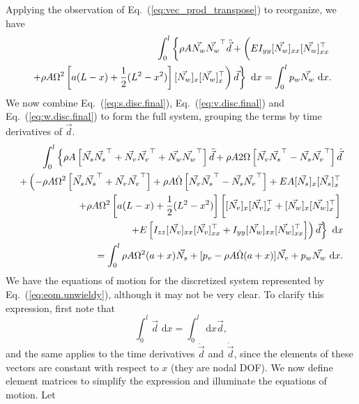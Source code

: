 Applying the observation of Eq.~(\ref{eq:vec_prod_transpose}) to reorganize, we have
\begin{eqnarray}
\label{eq:w.disc.final}
\int_0^l\left\lbrace\rho A\vec{N_w}\vec{N_w}^\top\ddot{\vec{d}}+\left(EI_{yy}[\vec{N_w}]_{xx}[\vec{N_w}]_{xx}^\top\vphantom{\frac{0}{0}}\right.\right.  \\
\left.\left.+\rho A\Omega^2\left[a(L-x)+\frac{1}{2}(L^2-x^2)\right][\vec{N_w}]_{x}[\vec{N_w}]_{x}^\top\right)\vec{d}\right\rbrace\text{ d}x 
= \int_0^lp_w\vec{N_w}\text{ d}x. \nonumber 
\end{eqnarray}
We now combine Eq.~(\ref{eq:s.disc.final}), Eq.~(\ref{eq:v.disc.final}) and Eq.~(\ref{eq:w.disc.final}) to form the full system, grouping the terms by time derivatives of $\vec{d}$.
\begin{eqnarray}
\label{eq:eom.unwieldy}
\int_0^l \left\lbrace\rho A\left[\vec{N_s}\vec{N_s}^\top+\vec{N_v}\vec{N_v}^\top+\vec{N_w}\vec{N_w}^\top\right]\ddot{\vec d}+\rho A2\Omega\left[\vec{N_v}\vec{N_s}^\top-\vec{N_s}\vec{N_v}^\top\right]\dot{\vec{d}}\right. \nonumber \\
\left.+\left(-\rho A\Omega^2\left[\vec{N_s}\vec{N_s}^\top+\vec{N_v}\vec{N_v}^\top\right]+\rho A\dot\Omega \left[\vec{N_v}\vec{N_s}^\top-\vec{N_s}\vec{N_v}^\top\right] +EA[\vec{N_s}]_x[\vec{N_s}]_x^\top\right.\right.\nonumber \\
\left.\left.+\rho A\Omega^2\left[a(L-x)+\frac{1}{2}(L^2-x^2)\right]\left[\vphantom{\frac{0}{0}}[\vec{N_v}]_{x}[\vec{N_v}]_{x}^\top+[\vec{N_w}]_{x}[\vec{N_w}]_{x}^\top\right]\right.\right.\\
\left.\left. +E\left[I_{zz}[\vec{N_v}]_{xx}[\vec{N_v}]_{xx}^\top+I_{yy}[\vec{N_w}]_{xx}[\vec{N_w}]_{xx}^\top\right]\right)\vec{d}\right\rbrace\text{ d}x \nonumber \\
 = \int_0^l \rho A\Omega^2(a+x)\vec{N_s}+[p_v - \rho A\dot\Omega(a+x)]\vec{N_v}+p_w\vec{N_w}\text{ d}x. \nonumber 
\end{eqnarray}
We have the equations of motion for the discretized system represented by Eq.~(\ref{eq:eom.unwieldy}), although it may not be very clear. To clarify this expression, first note that 
\begin{equation}
\int_0^l\vec d\text{ d}x = \int_0^l\text{ d}x\vec d,
\end{equation}
and the same applies to the time derivatives $\ddot{\vec d}$ and $\dot{\vec d}$, since the elements of these vectors are constant with respect to $x$ (they are nodal DOF). We now define element matrices to simplify the expression and illuminate the equations of motion. Let
